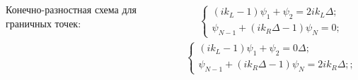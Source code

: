 \documentclass[10pt,pdf,hyperref={unicode},aspectratio={169}]{beamer}
\begin{document}
\begin{frame}
\begin{columns}
{\color{red}Конечно-разностная схема для граничных точек:}
\begin{columns}
	\footnotesize
	\begin{gather*}
		\begin{cases}
			(ik_{L}-1)\psi_{1} + \psi_{2} = 2ik_{L}\Delta;\\
			\psi_{N-1} + (ik_{R}\Delta - 1)\psi_{N} = 0;
		\end{cases}
	\end{gather*}
	\footnotesize
	\begin{gather*}
		\begin{cases}
			(ik_{L}-1)\psi_{1} + \psi_{2} = 0\Delta;\\
			\psi_{N-1} + (ik_{R}\Delta - 1)\psi_{N} = 2ik_{R}\Delta;;
		\end{cases}
	\end{gather*}
\end{columns}
\end{columns}
\end{frame}
\end{document}
